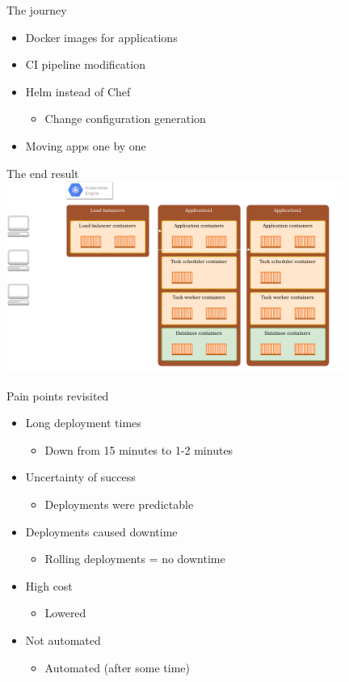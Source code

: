 \documentclass[17pt]{beamer}
\begin{document}
  \begin{frame}{The journey}
  \begin{itemize}
    \item<1-> Docker images for applications
    \item<2-> CI pipeline modification
    \item<3-> Helm instead of Chef
    \begin{itemize}
      \item Change configuration generation
    \end{itemize}
    \bigskip
    \item<4-> Moving apps one by one
  \end{itemize}
  \end{frame}

  \begin{frame}{The end result}
  \centering
  \includegraphics[width=11cm]{images/kubernetes_diagram.png}
  \end{frame}

  \begin{frame}{Pain points revisited}
  \begin{itemize}
    \item<1-> Long deployment times
    \begin{itemize}
      \item Down from 15 minutes to 1-2 minutes
    \end{itemize}
    \item<2-> Uncertainty of success
    \begin{itemize}
      \item Deployments were predictable
    \end{itemize}
    \item<3-> Deployments caused downtime
    \begin{itemize}
      \item Rolling deployments = no downtime
    \end{itemize}
    \item<4-> High cost
    \begin{itemize}
      \item Lowered
    \end{itemize}
    \item<5-> Not automated
    \begin{itemize}
      \item Automated (after some time)
    \end{itemize}
  \end{itemize}
  \end{frame}
\end{document}
